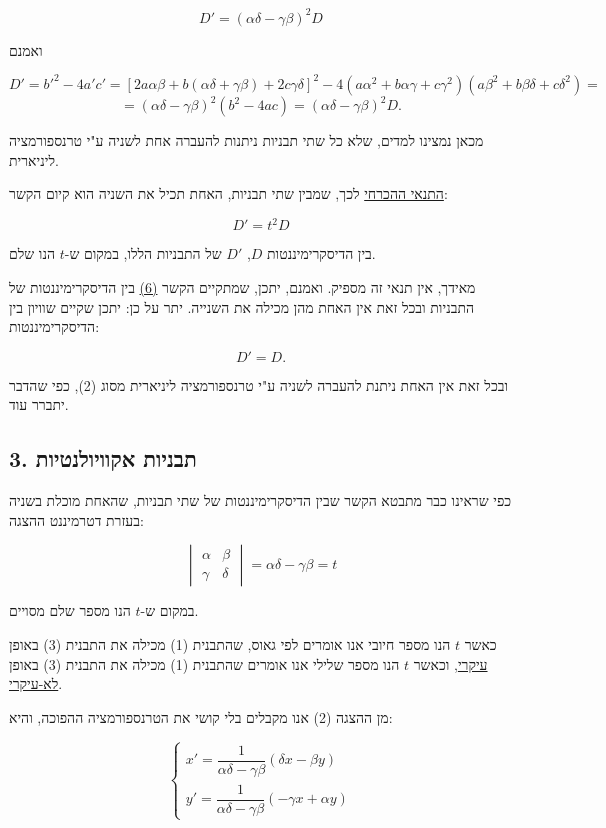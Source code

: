 \[ D' = (\alpha\delta - \gamma\beta)^2 D \tag{5} \]

ואמנם

\[
D' = b'^2 - 4a'c' = \left[2a\alpha\beta + b(\alpha\delta+\gamma\beta) + 2c\gamma\delta\right]^2 - 4(a\alpha^2+b\alpha\gamma+c\gamma^2)(a\beta^2+b\beta\delta+c\delta^2) =
\]
\[
= (\alpha\delta-\gamma\beta)^2(b^2-4ac) = (\alpha\delta-\gamma\beta)^2 D .
\]

מכאן נמצינו למדים, שלא כל שתי תבניות ניתנות להעברה אחת לשניה ע"י טרנספורמציה ליניארית.

\medskip
\underline{התנאי ההכרחי} לכך, שמבין שתי תבניות, האחת תכיל את השניה הוא קיום הקשר:

\[ D' = t^2 D \tag{6} \]

בין הדיסקרימיננטות $D$, $D'$ של התבניות הללו, במקום ש-$t$ הנו שלם.

\medskip
מאידך, אין תנאי זה מספיק. ואמנם, יתכן, שמתקיים הקשר \underline{(6)} בין הדיסקרימיננטות של התבניות ובכל זאת אין האחת מהן מכילה את השנייה. יתר על כן: יתכן שקיים שוויון בין הדיסקרימיננטות:

\[ D' = D. \tag{7} \]

ובכל זאת אין האחת ניתנת להעברה לשניה ע"י טרנספורמציה ליניארית מסוג (2), כפי שהדבר יתברר עוד.

\subsection*{3. תבניות אקוויולנטיות}

כפי שראינו כבר מתבטא הקשר שבין הדיסקרימיננטות של שתי תבניות, שהאחת מוכלת בשניה בעזרת דטרמיננט ההצגה:

\[
\begin{vmatrix} \alpha & \beta \\ \gamma & \delta \end{vmatrix} = \alpha\delta - \gamma\beta = t \tag{8}
\]

במקום ש-$t$ הנו מספר שלם מסויים.

\medskip
כאשר $t$ הנו מספר חיובי אנו אומרים לפי גאוס, שהתבנית (1) מכילה את התבנית (3) באופן \underline{עיקרי}, וכאשר $t$ הנו מספר שלילי אנו אומרים שהתבנית (1) מכילה את התבנית (3) באופן \underline{לא-עיקרי}.

מן ההצגה (2) אנו מקבלים בלי קושי את הטרנספורמציה ההפוכה, והיא:

\[
\begin{cases}
x' = \dfrac{1}{\alpha\delta - \gamma\beta} (\delta x - \beta y) \\[2mm]
y' = \dfrac{1}{\alpha\delta - \gamma\beta} (-\gamma x + \alpha y)
\end{cases}
\tag{9}
\]


